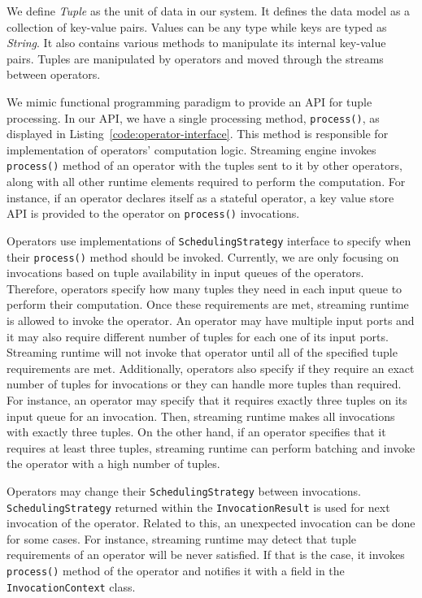 We define \textit{Tuple} as the unit of data in our system. It defines the data model as a collection of key-value pairs. Values can be any type while keys are typed as \textit{String}. It also contains various methods to manipulate its internal key-value pairs. Tuples are manipulated by operators and moved through the streams between operators.

We mimic functional programming paradigm to provide an API for tuple processing. In our API, we have a single processing method, \texttt{process()}, as displayed in Listing~\ref{code:operator-interface}. This method is responsible for implementation of operators' computation logic. Streaming engine invokes \texttt{process()} method of an operator with the tuples sent to it by other operators, along with all other runtime elements required to perform the computation. For instance, if an operator declares itself as a stateful operator, a key value store API is provided to the operator on \texttt{process()} invocations. 

Operators use implementations of \texttt{SchedulingStrategy} interface to specify when their \texttt{process()} method should be invoked. Currently, we are only focusing on invocations based on tuple availability in input queues of the operators. Therefore, operators specify how many tuples they need in each input queue to perform their computation. Once these requirements are met, streaming runtime is allowed to invoke the operator. An operator may have multiple input ports and it may also require different number of tuples for each one of its input ports. Streaming runtime will not invoke that operator until all of the specified tuple requirements are met. Additionally, operators also specify if they require an exact number of tuples for invocations or they can handle more tuples than required. For instance, an operator may specify that it requires exactly three tuples on its input queue for an invocation. Then, streaming runtime makes all invocations with exactly three tuples. On the other hand, if an operator specifies that it requires at least three tuples, streaming runtime can perform batching and invoke the operator with a high number of tuples. 

Operators may change their \texttt{SchedulingStrategy} between invocations. \texttt{SchedulingStrategy} returned within the \texttt{InvocationResult} is used for next invocation of the operator. Related to this, an unexpected invocation can be done for some cases. For instance, streaming runtime may detect that tuple requirements of an operator will be never satisfied. If that is the case, it invokes \texttt{process()} method of the operator and notifies it with a field in the \texttt{InvocationContext} class.

